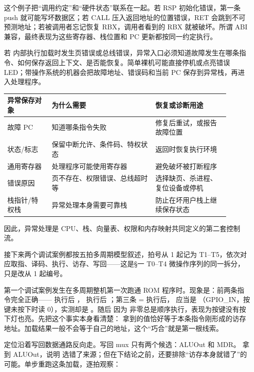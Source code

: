 这个例子把“调用约定”和“硬件状态”联系在一起。若 RSP 初始化错误，第一条 push 就可能写坏数据区；若 CALL 压入返回地址的位置错误，RET 会跳到不可预测地址；若被调用者忘记恢复 RBX，调用者看到的 RBX 就被破坏。所谓 ABI 兼容，最终表现为这些寄存器、栈位置和 PC 更新都按同一约定执行。

若  内部执行加载时发生页错误或总线错误，异常入口必须知道故障发生在哪条指令、如何保存返回上下文、是否能恢复。简单裸机可能直接停机或点亮错误 LED；带操作系统的机器会把故障地址、错误码和当前 PC 保存到异常栈，再进入处理程序。

\begin{longtable}{L{0.18\linewidth}L{0.42\linewidth}L{0.3\linewidth}}
\toprule
异常保存对象 & 为什么需要 & 恢复或诊断用途 \\
\midrule
故障 PC & 知道哪条指令失败 & 修复后重试，或报告故障位置 \\
状态/标志 & 保留中断允许、条件码、特权状态 & 返回时恢复执行环境 \\
通用寄存器 & 处理程序可能使用寄存器 & 避免破坏被打断程序 \\
错误原因 & 页不存在、权限错误、总线超时等 & 选择缺页、杀进程、复位设备或停机 \\
栈指针/特权栈 & 异常处理本身需要可靠栈 & 防止在坏用户栈上继续保存状态 \\
\bottomrule
\end{longtable}

因此，异常处理是 CPU、栈、向量表、权限和内存映射共同定义的第二套控制流。

接下来两个调试案例都按五拍多周期模型叙述，拍号从 1 起记为 T1–T5，依次对应取指、译码、执行、访存、写回——这是§一 T0–T4 微操作序列的同一拆分，只是改从 1 起编号。

第一个调试案例发生在多周期整机第一次跑通 ROM 程序时。现象是：前两条指令完全正确—— 执行后 ， 执行后 ；第三条 = 执行后， 应当是 （GPIO\_IN，按键未按下时读 0），实测却是 。随后  因为  非零总是顺序执行，表现为按键没有按下灯也亮。先把这个事实本身看清楚： 拿到的值恰好等于本条指令刚形成的访存地址。加载结果一般不会等于自己的地址，这个“巧合”就是第一根线索。

定位沿着写回数据通路反向走。写回 mux 只有两个候选：ALUOut 和 MDR。 拿到 ALUOut，说明  选错了来源；但在下结论之前，还要排除“访存本身就错了”的可能。单步重跑这条加载，逐拍观察：

